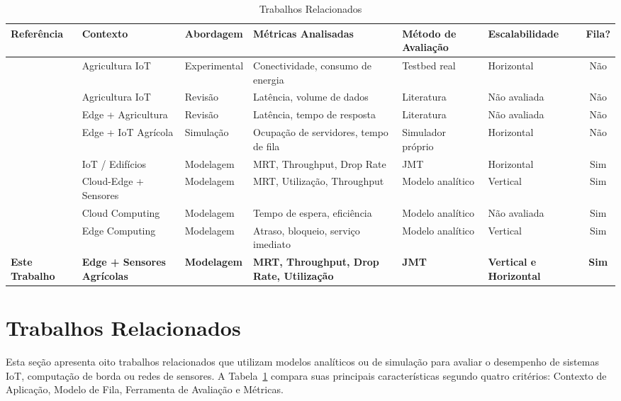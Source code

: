 \documentclass[conference]{IEEEtran}
\begin{document}
\begin{table}[t]
\centering
\caption{Trabalhos Relacionados}
\label{tab:related}
\renewcommand{\arraystretch}{1.3}
\begin{tabular}{|p{2.2cm}|p{3.2cm}|p{1.8cm}|p{2.5cm}|p{2.0cm}|p{1.6cm}|c|}
\hline
\textbf{Referência} &
\textbf{Contexto} &
\textbf{Abordagem} &
\textbf{Métricas Analisadas} &
\textbf{Método de Avaliação} &
\textbf{Escalabilidade} &
\textbf{Fila?} \\
\hline
\cite{atalla2023iot} &
Agricultura IoT &
Experimental &
Conectividade, consumo de energia &
Testbed real &
Horizontal &
Não \\
\hline
\cite{benos2023applying} &
Agricultura IoT &
Revisão &
Latência, volume de dados &
Literatura &
Não avaliada &
Não \\
\hline
\cite{zhang2025edge} &
Edge + Agricultura &
Revisão &
Latência, tempo de resposta &
Literatura &
Não avaliada &
Não \\
\hline
\cite{wang2022edge} &
Edge + IoT Agrícola &
Simulação &
Ocupação de servidores, tempo de fila &
Simulador próprio &
Horizontal &
Não \\
\hline
\cite{santos2021iot} &
IoT / Edifícios &
Modelagem &
MRT, Throughput, Drop Rate &
JMT &
Horizontal &
Sim \\
\hline
\cite{rocha2025enhancing} &
Cloud-Edge + Sensores &
Modelagem &
MRT, Utilização, Throughput &
Modelo analítico &
Vertical &
Sim \\
\hline
\cite{mmck2024performance} &
Cloud Computing &
Modelagem &
Tempo de espera, eficiência &
Modelo analítico &
Não avaliada &
Sim \\
\hline
\cite{li2025modeling} &
Edge Computing &
Modelagem &
Atraso, bloqueio, serviço imediato &
Modelo analítico &
Vertical &
Sim \\
\hline
\textbf{Este Trabalho} &
\textbf{Edge + Sensores Agrícolas} &
\textbf{Modelagem} &
\textbf{MRT, Throughput, Drop Rate, Utilização} &
\textbf{JMT} &
\textbf{Vertical e Horizontal} &
\textbf{Sim} \\
\hline
\end{tabular}
\end{table}

\section{Trabalhos Relacionados}

Esta seção apresenta oito trabalhos relacionados que utilizam
modelos analíticos ou de simulação para avaliar o desempenho
de sistemas IoT, computação de borda ou redes de sensores. A
Tabela~\ref{tab:related} compara suas principais
características segundo quatro critérios: Contexto de
Aplicação, Modelo de Fila, Ferramenta de Avaliação e Métricas.
\end{document}

